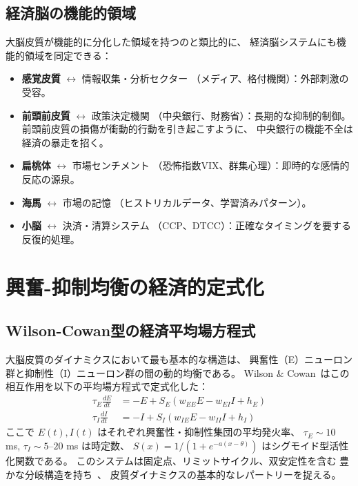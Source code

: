 \documentclass[12pt,twocolumn]{ltjsarticle}
\begin{document}
\subsection{経済脳の機能的領域}

大脳皮質が機能的に分化した領域を持つのと類比的に、
経済脳システムにも機能的領域を同定できる：

\begin{itemize}
\item \textbf{感覚皮質} $\leftrightarrow$ 情報収集・分析セクター
（メディア、格付機関）：外部刺激の受容。

\item \textbf{前頭前皮質} $\leftrightarrow$ 政策決定機関
（中央銀行、財務省）：長期的な抑制的制御。
前頭前皮質の損傷が衝動的行動を引き起こすように、
中央銀行の機能不全は経済の暴走を招く。

\item \textbf{扁桃体} $\leftrightarrow$ 市場センチメント
（恐怖指数VIX、群集心理）：即時的な感情的反応の源泉。

\item \textbf{海馬} $\leftrightarrow$ 市場の記憶
（ヒストリカルデータ、学習済みパターン）。

\item \textbf{小脳} $\leftrightarrow$ 決済・清算システム
（CCP、DTCC）：正確なタイミングを要する反復的処理。
\end{itemize}


\section{興奮-抑制均衡の経済的定式化}
\label{sec:ei_balance}

\subsection{Wilson-Cowan型の経済平均場方程式}

大脳皮質のダイナミクスにおいて最も基本的な構造は、
興奮性（E）ニューロン群と抑制性（I）ニューロン群の間の動的均衡である。
Wilson \& Cowan~\cite{Wilson1972}はこの相互作用を以下の平均場方程式で定式化した：
\begin{align}
\tau_E \frac{dE}{dt} &= -E + S_E(w_{EE} E - w_{EI} I + h_E) \\
\tau_I \frac{dI}{dt} &= -I + S_I(w_{IE} E - w_{II} I + h_I)
\end{align}
ここで $E(t), I(t)$ はそれぞれ興奮性・抑制性集団の平均発火率、
$\tau_E \sim 10$ ms, $\tau_I \sim 5$--$20$ ms は時定数、
$S(x) = 1/(1 + e^{-a(x-\theta)})$ はシグモイド型活性化関数である。
このシステムは固定点、リミットサイクル、双安定性を含む
豊かな分岐構造を持ち~\cite{Brunel2000}、
皮質ダイナミクスの基本的なレパートリーを捉える。
\end{document}
